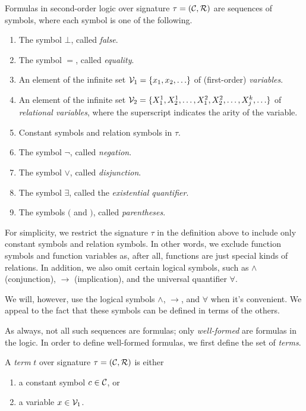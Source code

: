 \documentclass[11pt,twoside=off,numbers=noenddot]{scrbook}
\begin{document}
Formulas in second-order logic over signature $\tau = (\mathcal{C},
\mathcal{R})$ are sequences of symbols, where each symbol is one of the following.
\begin{enumerate}
  \item The symbol $\bot$, called \emph{false}.
  \item The symbol $=$, called \emph{equality}.
  \item An element of the infinite set $\vars_1 = \set{x_1, x_2,
    \dots}$ of (first-order) \emph{variables}.
  \item An element of the infinite set $\vars_2 = \set{X_1^1, X_2^1,
    \dots, X_1^2, X_2^2, \dots, X_j^k, \dots}$ of \emph{relational
    variables}, where the superscript indicates the arity of the variable.
  \item Constant symbols and relation symbols in $\tau$.
  \item The symbol $\neg$, called \emph{negation}.
  \item The symbol $\vee$, called \emph{disjunction}.
  \item The symbol $\exists$, called the \emph{existential quantifier}.
  \item The symbols $($ and $)$, called \emph{parentheses}.
\end{enumerate}

\begin{remark}
  For simplicity, we restrict the signature $\tau$ in the definition
  above to include only constant symbols and relation symbols. In
  other words, we exclude function symbols and function variables as,
  after all, functions are just special kinds of relations. In
  addition, we also omit certain logical symbols, such as $\wedge$
  (conjunction), $\rightarrow$ (implication), and the universal
  quantifier $\forall$.
\end{remark}

\begin{abuse}
  We will, however, use the logical symbols $\wedge$, $\rightarrow$,
  and $\forall$ when it's convenient. We appeal to the fact that
  these symbols can be defined in terms of the others.
\end{abuse}

As always, not all such sequences are formulas; only
\emph{well-formed} are formulas in the logic. In order to define
well-formed formulas, we first define the set of \emph{terms}.

\begin{definition}
  A \emph{term} $t$ over signature $\tau = (\mathcal{C}, \mathcal{R})$ is either
  \begin{enumerate}
    \item a constant symbol $c \in \mathcal{C}$, or
    \item a variable $x \in \mathcal{V}_1$.
  \end{enumerate}
\end{definition}
\end{document}
